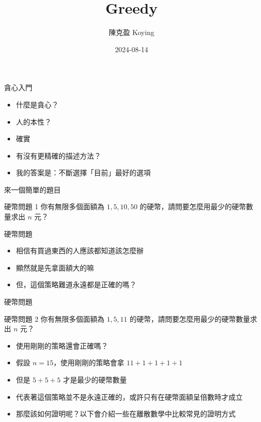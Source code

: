 \documentclass[aspectratio=169]{beamer}
\title{Greedy}
\author{陳克盈 Koying}
\date{2024-08-14}
\begin{document}
    \begin{frame}
        \titlepage
    \end{frame}

    \begin{frame}{貪心入門}
        \begin{itemize}
            \item<1-> 什麼是貪心？
            \item<2-> 人的本性？
            \item<3-> 確實
            \item<4-> 有沒有更精確的描述方法？
            \item<5-> 我的答案是：不斷選擇「目前」最好的選項
        \end{itemize}
    \end{frame}

    \begin{frame}{來一個簡單的題目}
        \begin{block}{硬幣問題 1}
            你有無限多個面額為 $1, 5, 10, 50$ 的硬幣，請問要怎麼用最少的硬幣數量求出 $n$ 元？
        \end{block}
    \end{frame}

    \begin{frame}{硬幣問題}
        \begin{itemize}
            \item<1-> 相信有買過東西的人應該都知道該怎麼辦
            \item<1-> 顯然就是先拿面額大的嘛
            \item<2-> 但，這個策略難道永遠都是正確的嗎？
        \end{itemize}
    \end{frame}

    \begin{frame}{硬幣問題}
        \begin{block}{硬幣問題 2}
            你有無限多個面額為 $1, 5, 11$ 的硬幣，請問要怎麼用最少的硬幣數量求出 $n$ 元？
        \end{block}

        \begin{itemize}
            \item<1-> 使用剛剛的策略還會正確嗎？
            \item<2-> 假設 $n = 15$，使用剛剛的策略會拿 $11 + 1 + 1 + 1 + 1$
            \item<2-> 但是 $5 + 5 + 5$ 才是最少的硬幣數量
            \item<3-> 代表著這個策略並不是永遠正確的，或許只有在硬幣面額呈倍數時才成立
            \item<4-> 那麼該如何證明呢？以下會介紹一些在離散數學中比較常見的證明方式
        \end{itemize}
    \end{frame}
\end{document}
